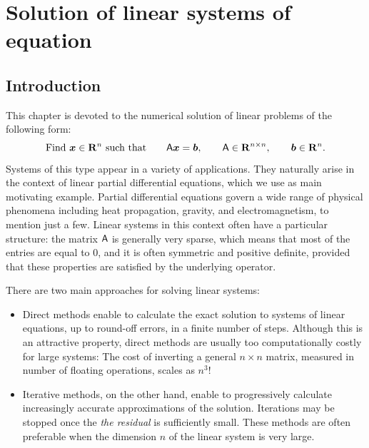 \chapter{Solution of linear systems of equation}
\label{cha:solution_of_linear_systems}
\minitoc

\section*{Introduction}
This chapter is devoted to the numerical solution of linear problems of the following form:
\begin{equation}
    \label{eq:linear_system}
    \text{Find $\mathbf{\boldsymbol{x}} \in \mathbf R^n$ such that} \qquad
    \mathsf A \mathbf{\boldsymbol{x}} = \mathbf{\boldsymbol{b}},
    \qquad \mathsf A \in \mathbf R^{n \times n},
    \qquad \mathbf{\boldsymbol{b}} \in \mathbf R^n.
\end{equation}
Systems of this type appear in a variety of applications.
They naturally arise in the context of linear partial differential equations,
which we use as main motivating example.
Partial differential equations govern a wide range of physical phenomena including heat propagation, gravity, and electromagnetism,
to mention just a few.
Linear systems in this context often have a particular structure:
the matrix $\mathsf A$ is generally very sparse,
which means that most of the entries are equal to 0,
and it is often symmetric and positive definite,
provided that these properties are satisfied by the underlying operator.

There are two main approaches for solving linear systems:
\begin{itemize}
    \item
        Direct methods enable to calculate the exact solution to systems of linear equations,
        up to round-off errors, in a finite number of steps.
        Although this is an attractive property,
        direct methods are usually too computationally costly for large systems:
        The cost of inverting a general $n \times n$ matrix,
        measured in number of floating operations,
        scales as $n^3$!

    \item
        Iterative methods, on the other hand,
        enable to progressively calculate increasingly accurate approximations of the solution.
        Iterations may be stopped once the \emph{the residual} is sufficiently small.
        These methods are often preferable when the dimension $n$ of the linear system is very large.
\end{itemize}

